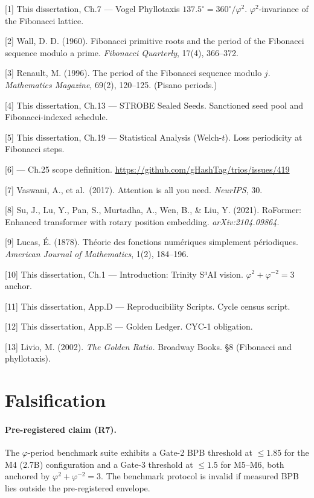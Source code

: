 [1] This dissertation, Ch.7 --- Vogel
Phyllotaxis \(137.5^\circ = 360^\circ/\varphi^2\).
\(\varphi^2\)-invariance of the Fibonacci lattice.

[2] Wall, D. D. (1960). Fibonacci primitive
roots and the period of the Fibonacci sequence
modulo a prime. \emph{Fibonacci Quarterly}, 17(4),
366--372.

[3] Renault, M. (1996). The period of the
Fibonacci sequence modulo \(j\). \emph{Mathematics
Magazine}, 69(2), 120--125. (Pisano periods.)

[4] This dissertation, Ch.13 --- STROBE Sealed
Seeds. Sanctioned seed pool and Fibonacci-indexed
schedule.

[5] This dissertation, Ch.19 --- Statistical
Analysis (Welch-\(t\)). Loss periodicity at
Fibonacci steps.

[6]  --- Ch.25
scope definition.
\url{https://github.com/gHashTag/trios/issues/419}

[7] Vaswani, A., et al.~(2017). Attention is
all you need. \emph{NeurIPS}, 30.

[8] Su, J., Lu, Y., Pan, S., Murtadha, A.,
Wen, B., \& Liu, Y. (2021). RoFormer: Enhanced
transformer with rotary position embedding.
\emph{arXiv:2104.09864}.

[9] Lucas, É. (1878). Théorie des fonctions
numériques simplement périodiques. \emph{American
Journal of Mathematics}, 1(2), 184--196.

[10] This dissertation, Ch.1 --- Introduction:
Trinity S³AI vision.
\(\varphi^2 + \varphi^{-2} = 3\) anchor.

[11] This dissertation, App.D ---
Reproducibility Scripts. Cycle census script.

[12] This dissertation, App.E --- Golden
Ledger. CYC-1 obligation.

[13] Livio, M. (2002). \emph{The Golden
Ratio.} Broadway Books. §8 (Fibonacci and
phyllotaxis).

\section{Falsification}
\label{fa_25:sec:falsification:ch25}

\paragraph{Pre-registered claim (R7).}
The $\varphi$-period benchmark suite exhibits a Gate-2 BPB threshold at
$\le 1.85$ for the M4 (2.7B) configuration and a Gate-3 threshold at
$\le 1.5$ for M5--M6, both anchored by $\varphi^2 + \varphi^{-2} = 3$.
The benchmark protocol is invalid if measured BPB lies outside the
pre-registered envelope.

